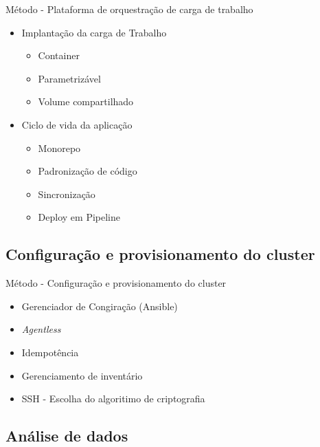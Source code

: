 \documentclass[10pt,brazil]{beamer}
\theoremstyle{definition}
\begin{document}
\begin{frame}{Método - Plataforma de orquestração de carga de trabalho}
  \begin{itemize}
    \item Implantação da carga de Trabalho
          \begin{itemize}
            \item Container
            \item Parametrizável
            \item Volume compartilhado
          \end{itemize}
    \item Ciclo de vida da aplicação
          \begin{itemize}
            \item Monorepo \cite{brito_monorepos_2018}
            \item Padronização de código
            \item Sincronização
            \item Deploy em Pipeline
          \end{itemize}
  \end{itemize}
\end{frame}

\subsection{Configuração e provisionamento do cluster}

\begin{frame}{Método - Configuração e provisionamento do cluster}
  \begin{itemize}
    \item Gerenciador de Congiração (Ansible\textregistered)
    \item \emph{Agentless}
    \item Idempotência
    \item Gerenciamento de inventário
    \item SSH - Escolha do algoritimo de criptografia \cite{noauthor_rfc4254_nodate}
  \end{itemize}
\end{frame}

\subsection{Análise de dados}
\end{document}
